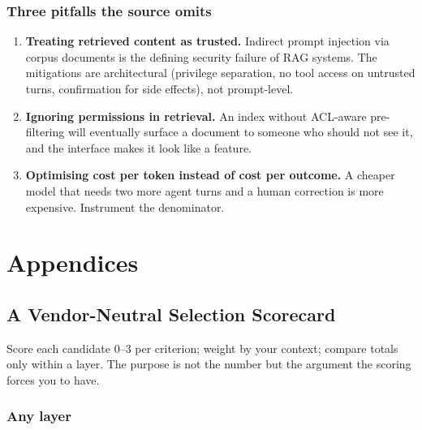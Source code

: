 \documentclass[11pt,twoside,openright]{book}
\theoremstyle{definition}
\theoremstyle{plain}
\theoremstyle{remark}
\newcommand{\term}[1]{\textbf{#1}}
\begin{document}
\section{Three pitfalls the source omits}

\begin{enumerate}[leftmargin=1.6em,itemsep=4pt]
  \item \term{Treating retrieved content as trusted.} Indirect prompt injection
        via corpus documents is the defining security failure of RAG systems.
        The mitigations are architectural (privilege separation, no tool access
        on untrusted turns, confirmation for side effects), not prompt-level.
  \item \term{Ignoring permissions in retrieval.} An index without ACL-aware
        pre-filtering will eventually surface a document to someone who should
        not see it, and the interface makes it look like a feature.
  \item \term{Optimising cost per token instead of cost per outcome.} A cheaper
        model that needs two more agent turns and a human correction is more
        expensive. Instrument the denominator.
\end{enumerate}

\cleardoublepage

\appendix
\part{Appendices}

\chapter{A Vendor-Neutral Selection Scorecard}
\label{app:scorecard}

Score each candidate $0$--$3$ per criterion; weight by your context; compare
totals only within a layer. The purpose is not the number but the argument the
scoring forces you to have.

\section{Any layer}
\end{document}

